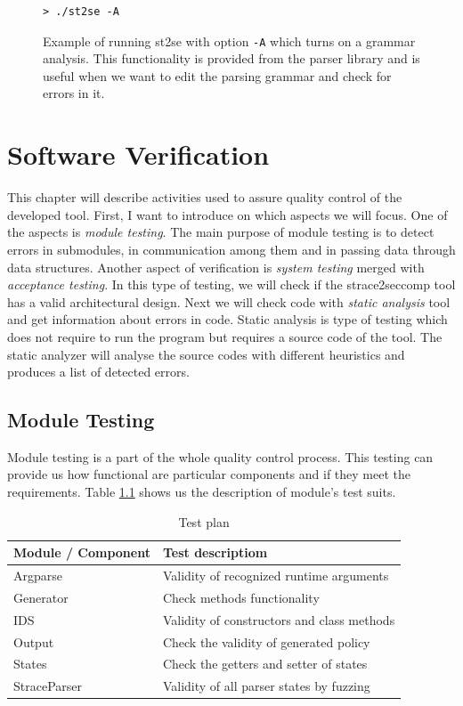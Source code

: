 \begin{figure}[H]
	\lstset{style=npl}
\begin{lstlisting}
> ./st2se -A
\end{lstlisting}
	\caption{Example of running st2se with option \texttt{-A} which turns on
	a grammar analysis. This functionality is provided from the parser library
	and is useful when we want to edit the parsing grammar and check for errors
	in it.}
	\label{exec/run3}
\end{figure}

\chapter{Software Verification}
This chapter will describe activities used to assure quality control of the
developed tool. First, I want to introduce on which aspects we will focus. One
of the aspects is \textit{module testing}. The main purpose of module testing is
to detect errors in submodules, in communication among them and in passing data
through data structures. Another aspect of verification is \textit{system
testing} merged with \textit{acceptance testing}. In this type of testing, we
will check if the strace2seccomp tool has a valid architectural design. Next we
will check code with \textit{static analysis} tool and get information about
errors in code. Static analysis is type of testing which does not require to run
the program but requires a source code of the tool. The static analyzer will
analyse the source codes with different heuristics and produces a list of
detected errors.


\section{Module Testing}
Module testing is a part of the whole quality control process.
This testing can provide us how functional are particular components and if they meet the requirements.
Table \ref{table:moduletesting} shows us the description of module's test suits.

\begin{table}[h]
	\centering
	\begin{tabular}{||l|p{10cm}||}
		\hline
		\textbf{Module / Component}	&	\textbf{Test descriptiom} \\ \hline \hline
		Argparse					& Validity of recognized runtime arguments \\ \hline
		Generator					& Check methods functionality \\ \hline
		IDS							& Validity of constructors and class methods \\ \hline
		Output                      & Check the validity of generated policy \\ \hline
		States						& Check the getters and setter of states \\ \hline
		StraceParser				& Validity of all parser states by fuzzing \\ \hline
	\end{tabular}
	\caption{Test plan}
	\label{table:moduletesting}
\end{table}

